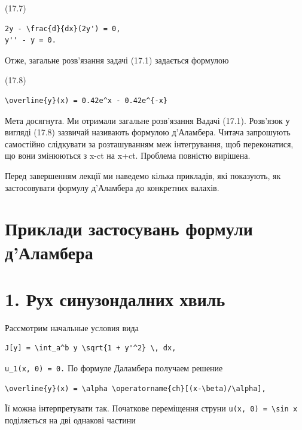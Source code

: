 \documentclass[
  ukrainian,
]{article}
\begin{document}
(17.7)

\begin{verbatim}
2y - \frac{d}{dx}(2y') = 0,
y'' - y = 0.
\end{verbatim}

Отже, загальне розв'язання задачі (17.1) задається формулою

(17.8)

\begin{verbatim}
\overline{y}(x) = 0.42e^x - 0.42e^{-x}
\end{verbatim}

Мета досягнута. Ми отримали загальне розв'язання Вадачі (17.1).
Розв'язок у вигляді (17.8) зазвичай називають формулою д'Аламбера.
Читача запрошують самостійно слідкувати за розташуванням меж
інтегрування, щоб переконатися, що вони змінюються з x-ct на x+ct.
Проблема повністю вирішена.

Перед завершенням лекції ми наведемо кілька прикладів, які показують, як
застосовувати формулу д'Аламбера до конкретних валахів.

\section{Приклади застосувань формули
д'Аламбера}\label{ux43fux440ux438ux43aux43bux430ux434ux438-ux437ux430ux441ux442ux43eux441ux443ux432ux430ux43dux44c-ux444ux43eux440ux43cux443ux43bux438-ux434ux430ux43bux430ux43cux431ux435ux440ux430}

\section{1. Рух синузондалних
хвиль}\label{ux440ux443ux445-ux441ux438ux43dux443ux437ux43eux43dux434ux430ux43bux43dux438ux445-ux445ux432ux438ux43bux44c}

Рассмотрим начальные условия вида

\begin{verbatim}
J[y] = \int_a^b y \sqrt{1 + y'^2} \, dx,
\end{verbatim}

\texttt{u\_1(x,\ 0)\ =\ 0.} По формуле Даламбера получаем решение

\begin{verbatim}
\overline{y}(x) = \alpha \operatorname{ch}[(x-\beta)/\alpha],
\end{verbatim}

Її можна інтерпретувати так. Початкове переміщення струни
\texttt{u(x,\ 0)\ =\ \textbackslash{}sin\ x} поділяється на дві однакові
частини
\end{document}
